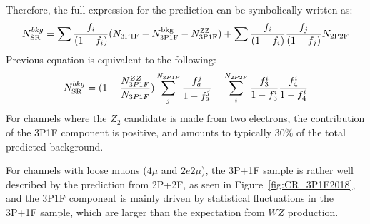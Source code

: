Therefore, the full expression for the prediction can be symbolically written as:
%
\begin{equation} 
\label{eq:PredictionSR}
N^{bkg}_{\rm SR} = \sum \frac{f_{i}}{(1-f_{i})} (N_{\rm 3P1F} - N^{\rm
bkg}_{\rm 3P1F} - N^{\rm ZZ}_{\rm 3P1F})
+ \sum \frac{f_{i}}{(1-f_{i})} \frac{f_{j}}{(1-f_{j})}N_{\rm 2P2F} \end{equation}
Previous equation is equivalent to the following:
\begin{equation}
\label{eq:PredictionSR2}
N^{bkg}_{\rm SR}= (1-\frac{N_{3P1F}^{ZZ}}{N_{3P1F}})\sum_j^{N_{3P1F}}\frac{f_a^j}{1-f_a^j} - \sum_i^{N_{2P2F}}\frac{f_3^i}{1-f_3^i}\frac{f_4^i}{1-f_4^i}
\end{equation}
For channels where the $Z_2$ candidate is made from two electrons, 
the contribution of the 3P1F component is 
positive, and amounts to typically $30 \%$ of the total predicted background.

For channels with loose muons ($4\mu$ and $2e2\mu$), the 3P+1F sample is rather well described by
the prediction from 2P+2F, as seen in Figure~\ref{fig:CR_3P1F2018}, and the
3P1F component is mainly driven by statistical fluctuations in the 3P+1F sample,
which are larger than the expectation from $WZ$ production.


